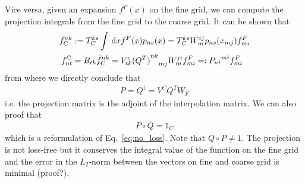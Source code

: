 Vice versa, given an expansion $f^F(x)$ on the fine grid, we can compute the projection integrals from the fine grid to the coarse grid.
It can be shown that
\begin{align}
  \bar f_C^{nk} &:= T_C^{ks}\int \,\mathrm{d}x f^F(x)p_{ns}(x) = T_C^{ks}  W_m^{ij}p_{ns}(x_{mj}) f^F_{mi} \\
  f^C_{nt} &= B_{tk}\bar f_C^{nk} = V^c_{tk}  {{(Q^T)}^{nk}}_{mj}W_m^{ji} f^F_{mi} =: {P_{nt}}^{mi} f^F_{mi}
  \label{eq:basic_projection}
\end{align}
from where we directly conclude that
\begin{align}
  P = Q^\dagger = V^C Q^T W_F
  \label{eq:projection_adjoint}
\end{align}
i.e. the projection matrix is the adjoint of the interpolation matrix.
We can also proof that
\begin{align}
  P\circ Q = 1_C
  \label{}
\end{align}
which is a reformulation of Eq.~\eqref{eq:no_loss}.
Note that $Q\circ P \neq 1$.
The projection is not loss-free but it conserves the integral
value of the function on the fine grid and the error in the 
$L_2$-norm between the vectors on fine and coarse grid is 
minimal (proof?).
